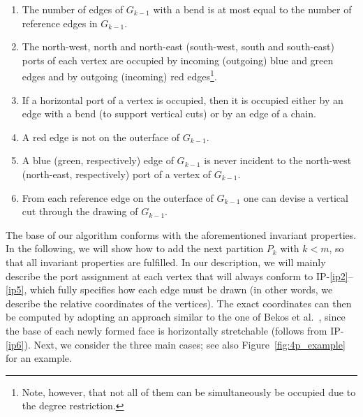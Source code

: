 \documentclass[a4paper,twoside,11pt]{article}
\begin{document}
\begin{enumerate}[{IP-}1:] \item \label{ip1}  The number of edges of
$G_{k-1}$ with a bend is at most equal to the number of reference
edges in $G_{k-1}$.
\item \label{ip2} The north-west, north and north-east (south-west,
south and south-east) ports of each vertex are occupied by incoming
(outgoing) blue and green edges and by outgoing (incoming) red
edges\footnote{Note, however, that not all of them can be
simultaneously be occupied due to the degree restriction.}.
\item \label{ip3} If a horizontal port of a vertex is occupied, then
it is occupied either by an edge with a bend (to support vertical
cuts) or by an edge of a chain.
\item \label{ip4} A red edge is not on the outerface of $G_{k-1}$.
\item \label{ip5} A blue (green, respectively) edge of $G_{k-1}$ is
never incident to the north-west (north-east, respectively) port of
a vertex of $G_{k-1}$.
\item \label{ip6} From each reference edge on the outerface of
$G_{k-1}$ one can devise a vertical cut through the drawing of
$G_{k-1}$.
\end{enumerate}
The base of our algorithm conforms with the aforementioned invariant
properties. In the following, we will show how to add the next
partition $P_k$ with $k<m$, so that all invariant properties are
fulfilled. In our description, we will mainly describe the port
assignment at each vertex that will always conform to
IP-\ref{ip2}--\ref{ip5}, which fully specifies how each edge must be
drawn (in other words, we describe the relative coordinates of the
vertices). The exact coordinates can then be computed by adopting an
approach similar to the one of Bekos et al.~\cite{BGKK14}, since the
base of each newly formed face is horizontally stretchable (follows
from IP-\ref{ip6}). Next, we consider the three main cases; see also
Figure~\ref{fig:4p_example} for an example.
\end{document}
